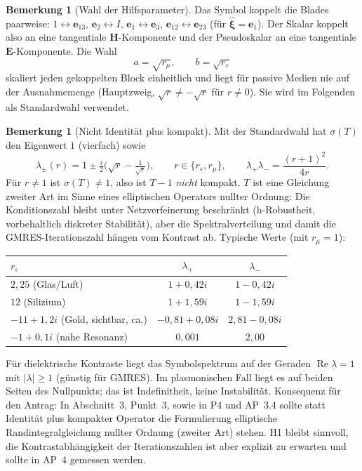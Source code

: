 \documentclass[11pt, a4paper]{article}
\newcommand{\mvec}[1]{\boldsymbol{#1}}
\theoremstyle{plain}
\theoremstyle{definition}
\newtheorem{bemerkung}[satz]{Bemerkung}
\begin{document}
\begin{bemerkung}[Wahl der Hilfsparameter]
Das Symbol koppelt die Blades paarweise: $1\leftrightarrow\mvec{e}_{13}$,
$\mvec{e}_2\leftrightarrow I$, $\mvec{e}_1\leftrightarrow\mvec{e}_3$,
$\mvec{e}_{12}\leftrightarrow\mvec{e}_{23}$ (für $\hat{\mvec{\xi}}=\mvec{e}_1$).
Der Skalar koppelt also an eine tangentiale $\mvec{H}$-Komponente und der
Pseudoskalar an eine tangentiale $\mvec{E}$-Komponente. Die Wahl
\[
  a = \sqrt{r_\mu},\qquad b = \sqrt{r_\varepsilon}
\]
skaliert jeden gekoppelten Block einheitlich und liegt für passive Medien nie auf
der Ausnahmemenge (Hauptzweig, $\sqrt{r}\neq-\sqrt{r}$ für $r\neq0$). Sie wird
im Folgenden als Standardwahl verwendet.
\end{bemerkung}

\begin{bemerkung}[Nicht Identität plus kompakt]\label{bem:nichtkompakt}
Mit der Standardwahl hat $\sigma(T)$ den Eigenwert $1$ (vierfach) sowie
\[
  \lambda_\pm(r) = 1\pm\tfrac{i}{2}\Big(\sqrt{r}-\tfrac{1}{\sqrt{r}}\Big),\qquad
  r\in\{r_\varepsilon,r_\mu\},\qquad \lambda_+\lambda_- = \frac{(r+1)^2}{4r}.
\]
Für $r\neq1$ ist $\sigma(T)\neq1$, also ist $T-1$ \emph{nicht} kompakt. $T$ ist
eine Gleichung zweiter Art im Sinne eines elliptischen Operators nullter Ordnung:
Die Konditionszahl bleibt unter Netzverfeinerung beschränkt (h-Robustheit,
vorbehaltlich diskreter Stabilität), aber die Spektralverteilung und damit die
GMRES-Iterationszahl hängen vom Kontrast ab. Typische Werte (mit $r_\mu = 1$):
\begin{center}\small
\begin{tabular}{lcc}
\toprule
$r_\varepsilon$ & $\lambda_+$ & $\lambda_-$\\
\midrule
$2{,}25$ (Glas/Luft) & $1+0{,}42i$ & $1-0{,}42i$\\
$12$ (Silizium) & $1+1{,}59i$ & $1-1{,}59i$\\
$-11+1{,}2i$ (Gold, sichtbar, ca.) & $-0{,}81+0{,}08i$ & $2{,}81-0{,}08i$\\
$-1+0{,}1i$ (nahe Resonanz) & $0{,}001$ & $2{,}00$\\
\bottomrule
\end{tabular}
\end{center}
Für dielektrische Kontraste liegt das Symbolspektrum auf der Geraden
$\operatorname{Re}\lambda=1$ mit $|\lambda|\ge1$ (günstig für GMRES). Im
plasmonischen Fall liegt es auf beiden Seiten des Nullpunkts; das ist
Indefinitheit, keine Instabilität. Konsequenz für den Antrag: In Abschnitt~3,
Punkt~3, sowie in P4 und AP~3.4 sollte statt \glqq Identität plus kompakter
Operator\grqq{} die Formulierung \glqq elliptische Randintegralgleichung nullter
Ordnung (zweiter Art)\grqq{} stehen. H1 bleibt sinnvoll, die Kontrastabhängigkeit der
Iterationszahlen ist aber explizit zu erwarten und sollte in AP~4 gemessen werden.
\end{bemerkung}
\end{document}
